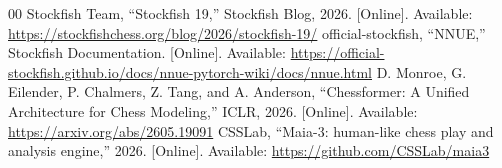 \documentclass[conference]{IEEEtran}
\begin{document}
\begin{thebibliography}{00}
 Stockfish Team, ``Stockfish 19,'' Stockfish Blog, 2026. [Online]. Available: \url{https://stockfishchess.org/blog/2026/stockfish-19/}
 official-stockfish, ``NNUE,'' Stockfish Documentation. [Online]. Available: \url{https://official-stockfish.github.io/docs/nnue-pytorch-wiki/docs/nnue.html}
 D. Monroe, G. Eilender, P. Chalmers, Z. Tang, and A. Anderson, ``Chessformer: A Unified Architecture for Chess Modeling,'' ICLR, 2026. [Online]. Available: \url{https://arxiv.org/abs/2605.19091}
 CSSLab, ``Maia-3: human-like chess play and analysis engine,'' 2026. [Online]. Available: \url{https://github.com/CSSLab/maia3}
\end{thebibliography}
\end{document}
